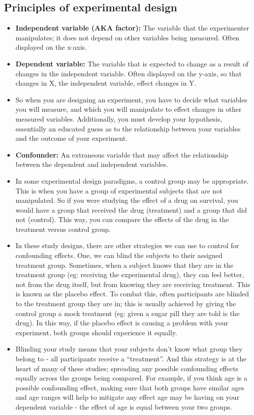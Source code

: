 \documentclass[11pt,fancy]{elegantbook}
\begin{document}
\subsection{Principles of experimental design}
\begin{itemize}
    \item \textbf{Independent variable (AKA factor):} The variable that the experimenter manipulates; it does not depend on other variables being measured. Often displayed on the x-axis.
    \item \textbf{Dependent variable:} The variable that is expected to change as a result of changes in the independent variable. Often displayed on the y-axis, so that changes in X, the independent variable, effect changes in Y.
    \item So when you are designing an experiment, you have to decide what variables you will measure, and which you will manipulate to effect changes in other measured variables. Additionally, you must develop your hypothesis, essentially an educated guess as to the relationship between your variables and the outcome of your experiment.
    \item \textbf{Confounder:} An extraneous variable that may affect the relationship between the dependent and independent variables.
    \item In some experimental design paradigms, a control group may be appropriate. This is when you have a group of experimental subjects that are not manipulated. So if you were studying the effect of a drug on survival, you would have a group that received the drug (treatment) and a group that did not (control). This way, you can compare the effects of the drug in the treatment versus control group.
    \item In these study designs, there are other strategies we can use to control for confounding effects. One, we can blind the subjects to their assigned treatment group. Sometimes, when a subject knows that they are in the treatment group (eg: receiving the experimental drug), they can feel better, not from the drug itself, but from knowing they are receiving treatment. This is known as the placebo effect. To combat this, often participants are blinded to the treatment group they are in; this is usually achieved by giving the control group a mock treatment (eg: given a sugar pill they are told is the drug). In this way, if the placebo effect is causing a problem with your experiment, both groups should experience it equally.
    \item Blinding your study means that your subjects don't know what group they belong to - all participants receive a “treatment”. And this strategy is at the heart of many of these studies; spreading any possible confounding effects equally across the groups being compared. For example, if you think age is a possible confounding effect, making sure that both groups have similar ages and age ranges will help to mitigate any effect age may be having on your dependent variable - the effect of age is equal between your two groups.

\end{itemize}
\end{document}
